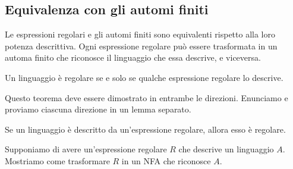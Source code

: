 \documentclass[12pt]{report}
\newcounter{theorem}
\newcounter{lemma}
\begin{document}
	\subsection{Equivalenza con gli automi finiti}
	Le espressioni regolari e gli automi finiti sono equivalenti rispetto alla loro potenza descrittiva. Ogni espressione regolare può essere trasformata in un automa finito che riconosce il linguaggio che essa descrive, e viceversa.
	\begin{theorem}{}{}
		Un linguaggio è regolare se e solo se qualche espressione regolare lo descrive.
	\end{theorem}
	Questo teorema deve essere dimostrato in entrambe le direzioni. Enunciamo e proviamo ciascuna direzione in un lemma separato.
	\begin{lemma}{}{}
		Se un linguaggio è descritto da un'espressione regolare, allora esso è regolare.
	\end{lemma}
	Supponiamo di avere un'espressione regolare $R$ che descrive un linguaggio $A$. Mostriamo come trasformare $R$ in un NFA che riconosce $A$.
\end{document}
